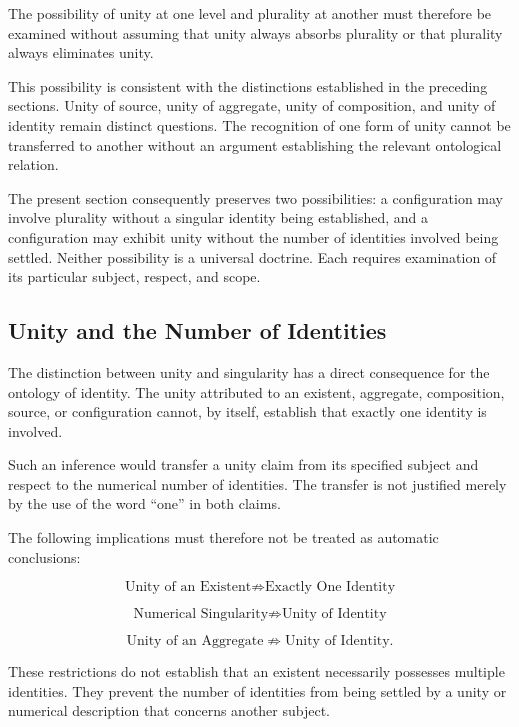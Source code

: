 The possibility of unity at one level and
plurality at another must therefore be
examined without assuming that unity
always absorbs plurality or that plurality
always eliminates unity.

This possibility is consistent with the
distinctions established in the preceding
sections. Unity of source, unity of aggregate,
unity of composition, and unity of identity
remain distinct questions. The recognition
of one form of unity cannot be transferred
to another without an argument establishing
the relevant ontological relation.

The present section consequently preserves
two possibilities: a configuration may
involve plurality without a singular identity
being established, and a configuration
may exhibit unity without the number of
identities involved being settled. Neither
possibility is a universal doctrine. Each
requires examination of its particular
subject, respect, and scope.

\subsection{Unity and the Number of Identities}

The distinction between unity and singularity
has a direct consequence for the ontology
of identity. The unity attributed to an
existent, aggregate, composition, source,
or configuration cannot, by itself, establish
that exactly one identity is involved.

Such an inference would transfer a unity
claim from its specified subject and respect
to the numerical number of identities.
The transfer is not justified merely by
the use of the word ``one'' in both claims.

The following implications must therefore
not be treated as automatic conclusions:

\[
\text{Unity of an Existent}
\not\Rightarrow
\text{Exactly One Identity}
\]

\[
\text{Numerical Singularity}
\not\Rightarrow
\text{Unity of Identity}
\]

\[
\text{Unity of an Aggregate}
\not\Rightarrow
\text{Unity of Identity}.
\]

These restrictions do not establish that
an existent necessarily possesses multiple
identities. They prevent the number of
identities from being settled by a unity
or numerical description that concerns
another subject.

